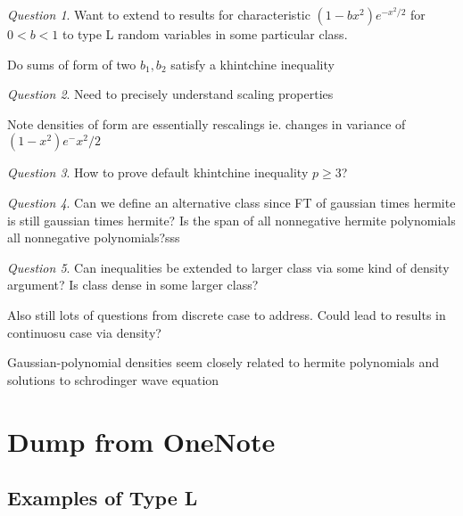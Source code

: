 \documentclass[11pt]{article}
\theoremstyle{remark}
\newtheorem*{quest}{Question}
\begin{document}
\begin{quest}
	Want to extend to results for characteristic $(1-bx^2)e^{-x^2/2}$ for $0 < b < 1$ to type L random variables in some particular class. 

	Do sums of form of two $b_1,b_2$ satisfy a khintchine inequality
\end{quest}

\begin{quest}
	Need to precisely understand scaling properties
\end{quest}

\begin{remark}
	Note densities of form are essentially rescalings ie. changes in variance of $(1-x^2)e^-x^2/2$
\end{remark}

\begin{quest}
	How to prove default khintchine inequality $p \geq 3$?
\end{quest}

\begin{quest}
	Can we define an alternative class since FT of gaussian times hermite is still gaussian times hermite? Is the span of all nonnegative hermite polynomials all nonnegative polynomials?sss
\end{quest}

\begin{quest}
	Can inequalities be extended to larger class via some kind of density argument? Is class dense in some larger class?

	Also still lots of questions from discrete case to address. Could lead to results in continuosu case via density?
\end{quest}

\begin{remark}
	Gaussian-polynomial densities seem closely related to hermite polynomials and solutions to schrodinger wave equation
\end{remark}

\section{Dump from OneNote}

\subsection{Examples of Type L}
\end{document}

